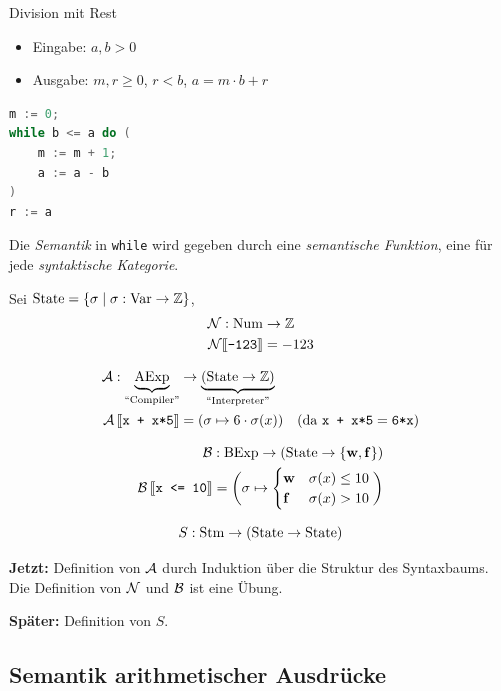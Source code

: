 \begin{example}
    Division mit Rest
    \begin{itemize}
        \item Eingabe: $a, b > 0$
        \item Ausgabe: $m ,r \geq 0$, $r < b$, $a = m \cdot b + r$
    \end{itemize}
\end{example}

\begin{lstlisting}[language=C, caption=Division mit Rest]
m := 0;
while b <= a do (
    m := m + 1;
    a := a - b
)
r := a
\end{lstlisting}

Die \emph{Semantik} in \texttt{while} wird gegeben durch eine \emph{semantische Funktion}, eine für jede \emph{syntaktische Kategorie}.

Sei $\operatorname{State} = \{ \sigma \mid \sigma: \operatorname{Var} \to \mathbb{Z} \}$, \zb{}
\begin{align*}
    \mathcal{N} : \operatorname{Num} & \to \mathbb{Z} \\
    \mathcal{N}\mathrm{[}\kern-.14em\mathrm{[}\texttt{-123}\mathrm{]}\kern-.14em\mathrm{]} & = -123
\end{align*}

\begin{align*}
    \operatorname{\mathcal{A}}: \underbrace{\operatorname{AExp}}_{\text{``Compiler''}} & \to \underbrace{(\operatorname{State} \to \mathbb{Z})}_{\text{``Interpreter''}} \\
    \operatorname{\mathcal{A}}\mathrm{[}\kern-.14em\mathrm{[}\texttt{x + x*5}\mathrm{]}\kern-.14em\mathrm{]} & = (\sigma \mapsto 6 \cdot \sigma(x)) \quad (\text{da }\texttt{x + x*5} = \texttt{6*x})
\end{align*}

\begin{align*}
    \operatorname{\mathcal{B}} : \operatorname{BExp} \to (\operatorname{State} \to \{ \operatorname{\mathbf{w}}, \operatorname{\mathbf{f}} \}) \\
    \operatorname{\mathcal{B}}\mathrm{[}\kern-.14em\mathrm{[}\texttt{x <= 10}\mathrm{]}\kern-.14em\mathrm{]} = \bigg( \sigma \mapsto \begin{cases}
        \operatorname{\mathbf{w}} & \sigma(x) \leq 10 \\
        \operatorname{\mathbf{f}} & \sigma(x) > 10
    \end{cases} \bigg)
\end{align*}

\[
S: \operatorname{Stm} \to (\operatorname{State} \to \operatorname{State})
\]

\textbf{Jetzt:} Definition von $\operatorname{\mathcal{A}}$ durch Induktion über die Struktur des Syntaxbaums. Die Definition von $\operatorname{\mathcal{N}}$ und $\operatorname{\mathcal{B}}$ ist eine Übung.

\textbf{Später:} Definition von $S$.



\subsection{Semantik arithmetischer Ausdrücke}

